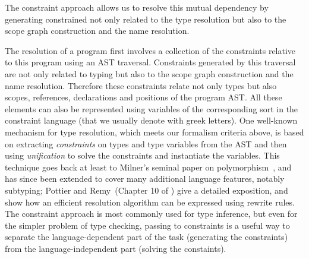 The constraint approach allows us to resolve this mutual dependency by
generating constrained not only related to the type resolution but also to the
scope graph construction and the name resolution.

The resolution of a program first involves a collection of the constraints
relative to this program using an AST traversal. Constraints generated by this
traversal are not only related to typing but also to the scope graph
construction and the name resolution. Therefore these constraints relate not
only types but also scopes, references, declarations and positions of the
program AST. All these elements can also be represented using variables of the
corresponding sort in the constraint language (that we usually denote with greek
letters). 
One well-known mechanism for type resolution,
which meets our formalism criteria above, is based on 
extracting {\it constraints} on types and type variables
from the AST and then using {\it unification} to solve the constraints
and instantiate the variables.
This technique goes back at least to Milner's seminal paper on polymorphism~\cite{Milner78:0},
and has since been extended to cover many additional language features,
notably subtyping; Pottier and Remy~(Chapter 10 of \cite{Pierce05advancedtopics}) give a detailed exposition,
and show how an efficient resolution algorithm can be expressed using rewrite rules. 
The constraint approach is most commonly used for 
type inference, but even for the simpler problem of type checking, 
passing to constraints is a useful way to separate the language-dependent
part of the task (generating the constraints) from the language-independent part
(solving the constaints).

